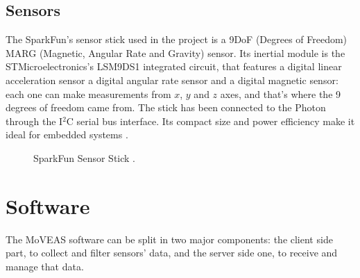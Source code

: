 \subsection{Sensors}
The SparkFun's sensor stick used in the project is a 9DoF (Degrees of Freedom) MARG (Magnetic, Angular Rate and Gravity) sensor. Its inertial module is the STMicroelectronics's LSM9DS1 integrated circuit, that features a digital linear acceleration sensor a digital angular rate sensor and a digital magnetic sensor: each one can make measurements from $x$, $y$ and $z$ axes, and that's where the 9 degrees of freedom came from. The stick has been connected to the Photon through the I$^2$C serial bus interface. Its compact size and power efficiency make it ideal for embedded systems \cite{SensorDatasheet}.
\begin{center}
	\begin{figure}[ht!]
		\caption{SparkFun Sensor Stick \cite{IMU}.}
	\end{figure}
\end{center}

\section{Software}
The MoVEAS software can be split in two major components: the client side part, to collect and filter sensors' data, and the server side one, to receive and manage that data.

